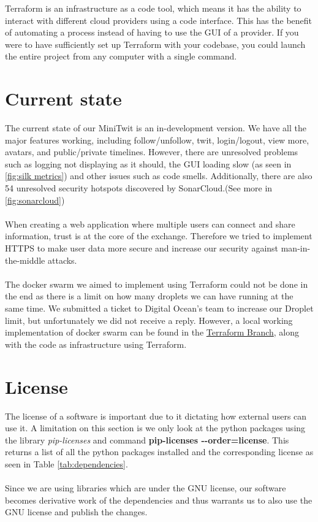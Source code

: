 Terraform is an infrastructure as a code tool, which means it has the ability to interact with different cloud providers using a code interface. This has the benefit of automating a process instead of having to use the GUI of a provider. If you were to have sufficiently set up Terraform with your codebase, you could launch the entire project from any computer with a single command.

\section*{Current state}
The current state of our MiniTwit is an in-development version. We have all the major features working, including follow/unfollow, twit, login/logout, view more, avatars, and public/private timelines. However, there are unresolved problems such as logging not displaying as it should, the GUI loading slow (as seen in \ref{fig:silk metrics}) and other issues such as code smells. Additionally, there are also 54 unresolved security hotspots discovered by SonarCloud.(See more in \ref{fig:sonarcloud})
\\\\
When creating a web application where multiple users can connect and share information, trust is at the core of the exchange. Therefore we tried to implement HTTPS to make user data more secure and increase our security against man-in-the-middle attacks.
\\\\
The docker swarm we aimed to implement using Terraform could not be done in the end as there is a limit on how many droplets we can have running at the same time. We submitted a ticket to Digital Ocean's team to increase our Droplet limit, but unfortunately we did not receive a reply. However, a local working implementation of docker swarm can be found in the \href{https://github.com/FiveGuys-DevOps/MiniTwit/tree/feature/terraform}{Terraform Branch}, along with the code as infrastructure using Terraform.

\section*{License}

The license of a software is important due to it dictating how external users can use it. A limitation on this section is we only look at the python packages using the library \textit{pip-licenses} and command \textbf{pip-licenses -\--order=license}. This returns a list of all the python packages installed and the corresponding license as seen in Table \ref{tab:dependencies}.
\\\\
Since we are using libraries which are under the GNU license, our software becomes derivative work of the dependencies and thus warrants us to also use the GNU license and publish the changes.

